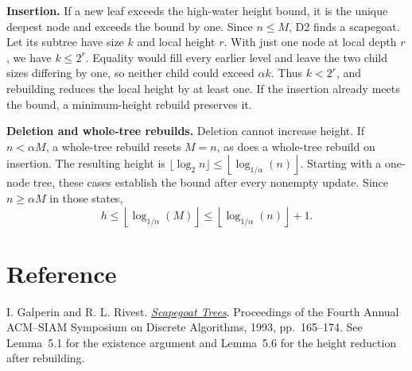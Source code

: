 \documentclass[11pt,a4paper]{article}
\newcommand{\limitheight}[1]{\left\lfloor\log_{1/\alpha}(#1)\right\rfloor}
\begin{document}
\textbf{Insertion.}
If a new leaf exceeds the high-water height bound, it is the unique
deepest node and exceeds the bound by one. Since \(n\leq M\), D2 finds
a scapegoat. Let its subtree have size \(k\) and local height \(r\).
With just one node at local depth \(r\), we have \(k\leq 2^r\).
Equality would fill every earlier level and leave the two child
sizes differing by one, so neither child could exceed \(\alpha k\).
Thus \(k<2^r\), and rebuilding reduces the local height by at least
one. If the insertion already meets the bound, a minimum-height
rebuild preserves it.

\textbf{Deletion and whole-tree rebuilds.}
Deletion cannot increase height. If \(n<\alpha M\), a whole-tree
rebuild resets \(M=n\), as does a whole-tree rebuild on insertion.
The resulting height is \(\lfloor\log_2 n\rfloor\leq\limitheight{n}\).
Starting with a one-node tree, these cases establish the bound after
every nonempty update. Since \(n\geq\alpha M\) in those states,
\[
  h\leq\limitheight{M}\leq\limitheight{n}+1.
\]

\section*{Reference}

I. Galperin and R. L. Rivest.
\href{https://people.csail.mit.edu/rivest/pubs/GR93.pdf}{\emph{Scapegoat Trees}}.
Proceedings of the Fourth Annual ACM--SIAM Symposium on Discrete
Algorithms, 1993, pp.~165--174. See Lemma~5.1 for the existence argument
and Lemma~5.6 for the height reduction after rebuilding.
\end{document}
